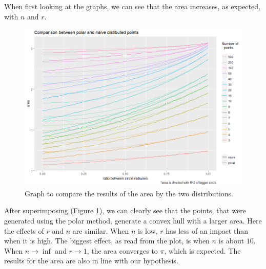 \documentclass[12pt,a4paper]{article}
\begin{document}
When first looking at the graphs, we can see that the area increases, as expected, with $n$ and $r$.

\begin{figure}[H]
\centering
\includegraphics[scale=0.63]{../graphs/graphs/area_comparison.png}
\caption{Graph to compare the results of the area by the two distributions.}
\label{f:comparison_area}
\end{figure}

After superimposing (Figure \ref{f:comparison_area}), we can clearly see that the points, that were generated using the polar method, generate a convex hull with a larger area. Here the effects of $r$ and $n$ are similar. When $n$ is low, $r$ has less of an impact than when it is high. The biggest effect, as read from the plot, is when $n$ is about $10$. \\
When $n\to\inf$ and $r\to1$, the area converges to $\pi$, which is expected. The results for the area are also in line with our hypothesis. \pagebreak
\end{document}
